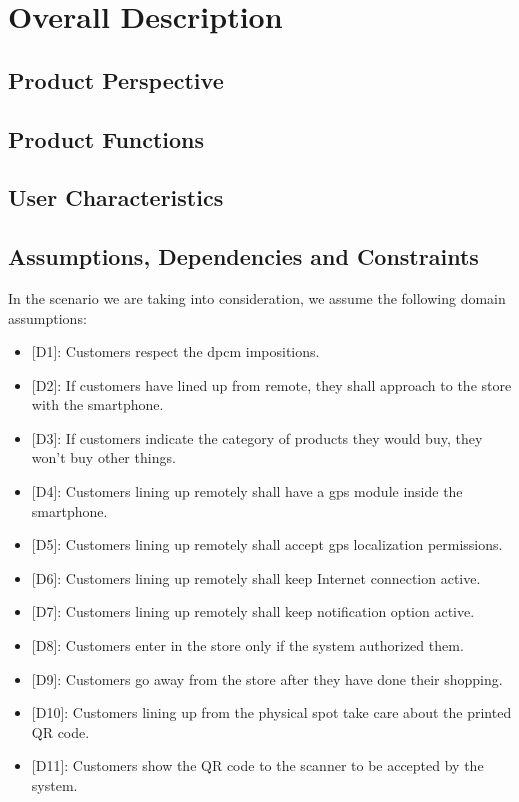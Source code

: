 \chapter{Overall Description}

\section{Product Perspective}

\section{Product Functions}

\section{User Characteristics}

\section{Assumptions, Dependencies and Constraints}

In the scenario we are taking into consideration, we assume the following domain assumptions:

\begin{itemize}

	\item {[D1]}: Customers respect the \gls{dpcm} impositions.
	\item {[D2]}: If customers have lined up from remote, they shall approach to the store with the smartphone.
	\item {[D3]}: If customers indicate the category of products they would buy, they won't buy other things.
	\item {[D4]}: Customers lining up remotely shall have a \gls{gps} module inside the smartphone.
	\item {[D5]}: Customers lining up remotely shall accept \gls{gps} localization permissions.
	\item {[D6]}: Customers lining up remotely shall keep Internet connection active.
	\item {[D7]}: Customers lining up remotely shall keep notification option active.
	\item {[D8]}: Customers enter in the store only if the system authorized them.
	\item {[D9]}: Customers go away from the store after they have done their shopping.
	\item {[D10]}: Customers lining up from the physical spot take care about the printed QR code.
	\item {[D11]}: Customers show the QR code to the scanner to be accepted by the system.

\end{itemize}